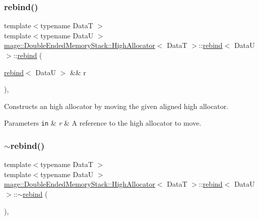 \subsubsection{\texorpdfstring{rebind()}{rebind()}\hspace{0.1cm}{\footnotesize\ttfamily [3/3]}}
{\footnotesize\ttfamily template$<$typename DataT $>$ \\
template$<$typename DataU $>$ \\
\hyperlink{structmage_1_1_double_ended_memory_stack_1_1_high_allocator}{mage\+::\+Double\+Ended\+Memory\+Stack\+::\+High\+Allocator}$<$ DataT $>$\+::\hyperlink{structmage_1_1_double_ended_memory_stack_1_1_high_allocator_1_1rebind}{rebind}$<$ DataU $>$\+::\hyperlink{structmage_1_1_double_ended_memory_stack_1_1_high_allocator_1_1rebind}{rebind} (\begin{DoxyParamCaption}\item[{\hyperlink{structmage_1_1_double_ended_memory_stack_1_1_high_allocator_1_1rebind}{rebind}$<$ DataU $>$ \&\&}]{r }\end{DoxyParamCaption})\hspace{0.3cm}{\ttfamily [private]}, {\ttfamily [delete]}}

Constructs an high allocator by moving the given aligned high allocator.


\begin{DoxyParams}[1]{Parameters}
\mbox{\tt in}  & {\em r} & A reference to the high allocator to move. \\
\hline
\end{DoxyParams}
\hypertarget{structmage_1_1_double_ended_memory_stack_1_1_high_allocator_1_1rebind_a6773f76027334ab9887e27d71dfe40f7}{}\label{structmage_1_1_double_ended_memory_stack_1_1_high_allocator_1_1rebind_a6773f76027334ab9887e27d71dfe40f7} 
\subsubsection{\texorpdfstring{$\sim$rebind()}{~rebind()}}
{\footnotesize\ttfamily template$<$typename DataT $>$ \\
template$<$typename DataU $>$ \\
\hyperlink{structmage_1_1_double_ended_memory_stack_1_1_high_allocator}{mage\+::\+Double\+Ended\+Memory\+Stack\+::\+High\+Allocator}$<$ DataT $>$\+::\hyperlink{structmage_1_1_double_ended_memory_stack_1_1_high_allocator_1_1rebind}{rebind}$<$ DataU $>$\+::$\sim$\hyperlink{structmage_1_1_double_ended_memory_stack_1_1_high_allocator_1_1rebind}{rebind} (\begin{DoxyParamCaption}{ }\end{DoxyParamCaption})\hspace{0.3cm}{\ttfamily [private]}, {\ttfamily [delete]}}

